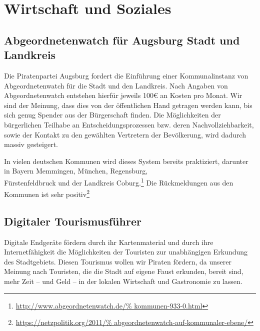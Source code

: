 \chapter{Wirtschaft und Soziales}

  \section{Abgeordnetenwatch für Augsburg Stadt und Landkreis}
  
  Die Piratenpartei Augsburg fordert die Einführung einer Kommunalinstanz von 
  Abgeordnetenwatch für die Stadt und den Landkreis. Nach Angaben von 
  Abgeordnetenwatch entstehen hierfür jeweils 100€ an Kosten pro Monat. Wir 
  sind der Meinung, dass dies von der öffentlichen Hand getragen werden kann, 
  bis sich genug Spender aus der Bürgerschaft finden. Die Möglichkeiten der 
  bürgerlichen Teilhabe an Entscheidungsprozessen bzw. deren 
  Nachvollziehbarkeit, sowie der Kontakt zu den gewählten Vertretern der 
  Bevölkerung, wird dadurch massiv gesteigert. 
  
  In vielen deutschen Kommunen wird dieses System bereits praktiziert, 
  darunter in Bayern Memmingen, München, Regensburg,\\ Fürstenfeldbruck und der
  Landkreis Coburg.\footnote{\url{http://www.abgeordnetenwatch.de/%
  kommunen-933-0.html}} Die Rückmeldungen aus den Kommunen ist sehr 
  positiv\footnote{\url{https://netzpolitik.org/2011/%
  abgeordnetenwatch-auf-kommunaler-ebene/}}
  
  \section{Digitaler Tourismusführer}
  
  Digitale Endgeräte fördern durch ihr Kartenmaterial und durch ihre 
  Internetfähigkeit die Möglichkeiten der Touristen zur unabhängigen Erkundung 
  des Stadtgebiets. Diesen Tourismus wollen wir Piraten fördern, da unserer 
  Meinung nach Touristen, die die Stadt auf eigene Faust erkunden, bereit 
  sind, mehr Zeit -- und Geld -- in der lokalen Wirtschaft und Gastronomie zu 
  lassen.
  
